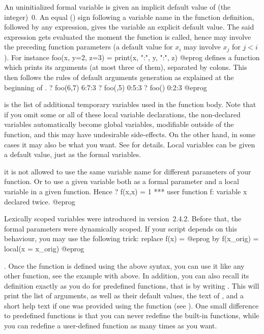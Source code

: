 An uninitialized formal variable is given an implicit default value of (the
integer)~0. An equal (\kbd{=}) sign following a variable name in the function
definition, followed by any expression, gives the variable an explicit
default value. The said expression gets evaluated the moment the function is
called, hence may involve the preceding function parameters (a default value
for $x_i$ may involve $x_j$ for $j < i$). For instance
\bprog
foo(x, y=2, z=3) = print(x, ":", y, ":", z)
@eprog
\noindent defines a function which prints its arguments (at most three of
them), separated by colons. This then follows the rules of default
arguments generation as explained at the beginning of
.
\bprog
? foo(6,7)
6:7:3
? foo(,5)
0:5:3
? foo()
0:2:3
@eprog

\noindent {} is the list of additional temporary
variables used in the function body. Note that if you omit some or all of
these local variable declarations, the non-declared variables automatically
become global variables, modifiable outside of the function, and this may
have undesirable side-effects. On the other hand, in some cases it may also
be what you want. See  for details. Local variables can
be given a default value, just as the formal variables.

 it is not allowed to use the same
variable name for different parameters of your function. Or to use a given
variable both as a formal parameter and a local variable in a given function.
Hence
\bprog
? f(x,x) = 1
  ***   user function f: variable x declared twice.
@eprog

 Lexically scoped variables were introduced in
version~2.4.2. Before that, the formal parameters were dynamically scoped.
If your script depends on this behaviour, you may use the following trick:
replace
\bprog
f(x) =
@eprog\noindent
by
\bprog
f(x_orig) = local(x = x_orig)
@eprog

. Once the function is defined using the above syntax, you can
use it like any other function, see the example with  above. In
addition, you can also recall its definition exactly as you do for predefined
functions, that is by writing . This will print the list of
arguments, as well as their default values, the text of , and a
short help text if one was provided using the  function (see
). One small difference to predefined functions is that
you can never redefine the built-in functions, while you can redefine a
user-defined function as many times as you want.

